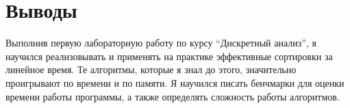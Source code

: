 \section{Выводы}

Выполнив первую лабораторную работу по курсу \enquote{Дискретный анализ}, я научился реализовывать и применять на практике эффективные сортировки за линейное время. Те алгоритмы, которые я знал до этого, значительно проигрывают по времени и по памяти. Я научился писать бенчмарки для оценки времени работы программы, а также определять сложность работы алгоритмов.   
\pagebreak